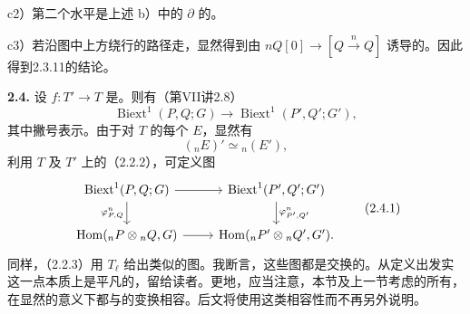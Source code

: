  c2）第二个水平是上述 b）中的 $\partial$ 的。

 c3）若沿图中上方绕行的路径走，显然得到由 $nQ[0]\longrightarrow[Q\xrightarrow n Q]$ 诱导的。因此得到2.3.11的结论。

\textbf{2.4.} 设 $f:T'\longrightarrow T$ 是。则有（第VII讲2.8）
\[\operatorname{Biext}^1(P,Q;G)\longrightarrow\operatorname{Biext}^1(P',Q';G'),\]
其中撇号表示。由于对 $T$ 的每个 $E$，显然有
\[({}_nE)'\simeq{}_n(E'),\]
利用 $T$ 及 $T'$ 上的（2.2.2），可定义图
\[\begin{tikzcd}
\operatorname{Biext}^1(P,Q;G)\arrow[r]\arrow[d,"{\varphi^n_{P,Q}}"']&
\operatorname{Biext}^1(P',Q';G')\arrow[d,"{\varphi^n_{P',Q'}}"]\\
\operatorname{Hom}({}_nP\otimes{}_nQ,G)\arrow[r]&\operatorname{Hom}({}_nP'\otimes{}_nQ',G').
\end{tikzcd}\tag{2.4.1}\]
同样，（2.2.3）用 $T_\ell$ 给出类似的图。我断言，这些图都是交换的。从定义出发实这一点本质上是平凡的，留给读者。更地，应当注意，本节及上一节考虑的所有，在显然的意义下都与的变换相容。后文将使用这类相容性而不再另外说明。
